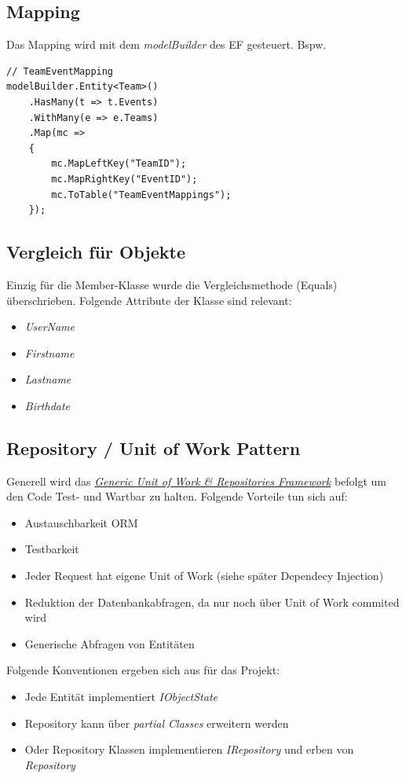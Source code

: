 	\subsection{Mapping}
	Das Mapping wird mit dem \textit{modelBuilder} des EF gesteuert. Bspw.
	\begin{lstlisting}[language=CSharp, caption=Mapping in VoluntaryoContext.cs, label=lst:mappingcontextcs, firstnumber=1]
// TeamEventMapping
modelBuilder.Entity<Team>()
    .HasMany(t => t.Events)
    .WithMany(e => e.Teams)
    .Map(mc =>
    {
        mc.MapLeftKey("TeamID");
        mc.MapRightKey("EventID");
        mc.ToTable("TeamEventMappings");
    });
    \end{lstlisting}

	\subsection{Vergleich für Objekte}
	Einzig für die Member-Klasse wurde die Vergleichsmethode (Equals) überschrieben. Folgende Attribute der Klasse sind relevant:
	\\\begin{itemize}
		\item \textit{UserName}
		\item \textit{Firstname}
		\item \textit{Lastname}
		\item \textit{Birthdate}
	\end{itemize}

	\subsection{Repository / Unit of Work Pattern}
	Generell wird das \href{https://genericunitofworkandrepositories.codeplex.com/}{\textit{Generic Unit of Work \& Repositories Framework}} befolgt um den Code Test- und Wartbar zu halten. Folgende Vorteile tun sich auf:
	\\\begin{itemize}	
		\item Austauschbarkeit ORM
		\item Testbarkeit
		\item Jeder Request hat eigene Unit of Work (siehe später Dependecy Injection)
		\item Reduktion der Datenbankabfragen, da nur noch über Unit of Work commited wird
		\item Generische Abfragen von Entitäten
	\end{itemize}
	Folgende Konventionen ergeben sich aus für das Projekt:
	\\\begin{itemize}
		\item Jede Entität implementiert \textit{IObjectState}
		\item Repository kann über \textit{partial Classes} erweitern werden
		\item Oder Repository Klassen implementieren \textit{IRepository} und erben von \textit{Repository}
	\end{itemize}

